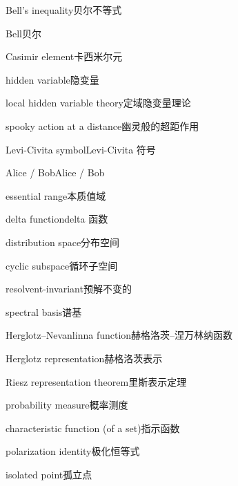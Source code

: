 \begin{multicols}{2}
Bell's inequality\hspace{0.9em}贝尔不等式\par
Bell\hspace{0.9em}贝尔\par
Casimir element\hspace{0.9em}卡西米尔元\par
hidden variable\hspace{0.9em}隐变量\par
local hidden variable theory\hspace{0.9em}定域隐变量理论\par
spooky action at a distance\hspace{0.9em}幽灵般的超距作用\par
Levi-Civita symbol\hspace{0.9em}Levi-Civita 符号\par
Alice / Bob\hspace{0.9em}Alice / Bob\par
essential range\hspace{0.9em}本质值域\par
delta function\hspace{0.9em}delta 函数\par
distribution space\hspace{0.9em}分布空间\par
cyclic subspace\hspace{0.9em}循环子空间\par
resolvent-invariant\hspace{0.9em}预解不变的\par
spectral basis\hspace{0.9em}谱基\par
Herglotz–Nevanlinna function\hspace{0.9em}赫格洛茨–涅万林纳函数\par
Herglotz representation\hspace{0.9em}赫格洛茨表示\par
Riesz representation theorem\hspace{0.9em}里斯表示定理\par
probability measure\hspace{0.9em}概率测度\par
characteristic function (of a set)\hspace{0.9em}指示函数\par
polarization identity\hspace{0.9em}极化恒等式\par
isolated point\hspace{0.9em}孤立点\par

\end{multicols}
